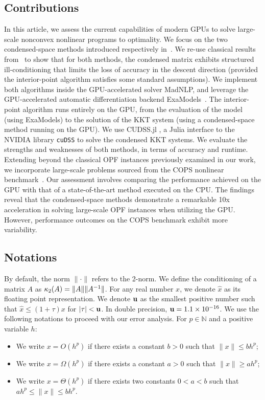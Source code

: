 \subsection{Contributions}
In this article, we assess the current capabilities of modern GPUs
to solve large-scale nonconvex nonlinear programs to optimality.
We focus on the two condensed-space methods
introduced respectively in~\cite{regev2023hykkt,shin2023accelerating}.
We re-use classical results from~\cite{wright1998ill} to show
that for both methods, the condensed matrix exhibits
structured ill-conditioning that limits the loss of accuracy in
the descent direction (provided the interior-point algorithm satisfies
some standard assumptions).
We implement both algorithms inside the GPU-accelerated solver MadNLP,
and leverage the GPU-accelerated automatic differentiation
backend ExaModels~\cite{shin2023accelerating}.
The interior-point algorithm runs entirely on the GPU, from
the evaluation of the model (using ExaModels) to the solution of
the KKT system (using a condensed-space method running on the GPU).
We use CUDSS.jl \cite{Montoison_CUDSS}, a Julia interface to the NVIDIA library {\tt cuDSS} to solve
the condensed KKT systems.
We evaluate the strengths
and weaknesses of both methods, in terms of accuracy and runtime.
Extending beyond the classical OPF instances previously examined in our work, we incorporate large-scale problems sourced from the COPS nonlinear benchmark~\cite{dolan2004benchmarking}.
Our assessment involves comparing the performance achieved on the GPU with that of a state-of-the-art method executed on the CPU.
The findings reveal that the condensed-space methods demonstrate a remarkable 10x acceleration in solving large-scale OPF instances when utilizing the GPU.
However, performance outcomes on the COPS benchmark exhibit more variability.

\subsection{Notations}
By default, the norm $\|\cdot\|$ refers to the 2-norm.
We define the conditioning of a matrix $A$ as
$\kappa_2(A) = \| A \| \|A^{-1} \|$.
For any real number $x$, we denote $\widehat{x}$ as its floating
point representation.
We denote $\mathbf{u}$ as the smallest positive number such that
$\widehat{x} \leq (1 + \tau) x$ for $|\tau| < \mathbf{u}$.
In double precision, $\mathbf{u} = 1.1 \times 10^{-16}$.
We use the following notations to proceed with our error analysis.
For $p \in \mathbb{N}$ and a positive variable $h$:
\begin{itemize}
  \item We write $x = O(h^p)$ if there exists a constant $b > 0$
    such that $\| x \| \leq b h^p$;
  \item We write $x = \Omega(h^p)$ if there exists a constant $a > 0$
    such that $\| x \| \geq a h^p$;
  \item We write $x = \Theta(h^p)$ if there exists two constants $0 < a < b$
    such that $a h^p \leq \| x \| \leq b h^p$.
\end{itemize}
